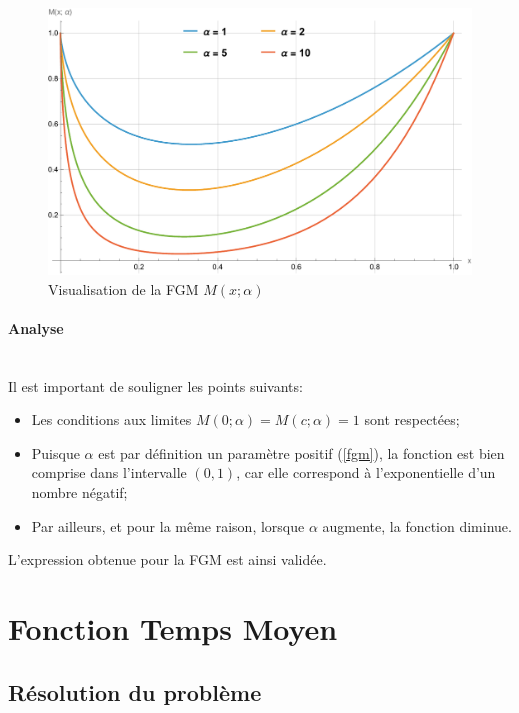 \begin{figure}[htb]
    \centering
    \includegraphics[width=0.5\linewidth]{img/validation/fgm.pdf}
    \caption{Visualisation de la \acl{FGM} $M(x;\alpha)$}\label{fig:FGMVisualisation}
\end{figure}
\FloatBarrier\paragraph{Analyse}\phantom{}\\
Il est important de souligner les points suivants:
\begin{itemize}
    \item Les conditions aux limites $M(0; \alpha) = M(c; \alpha) = 1$ sont respectées;
    \item Puisque $\alpha$ est par définition un paramètre positif (\ref{fgm}), la fonction est bien comprise dans l'intervalle $(0, 1)$, car elle correspond à l'exponentielle d'un nombre négatif; 
    \item Par ailleurs, et pour la même raison, lorsque $\alpha$ augmente, la fonction diminue.
\end{itemize}
L'expression obtenue pour la \acl{FGM} est ainsi validée. 

\section{Fonction Temps Moyen}\label{section_mean_eq}
\subsection{Résolution du problème}
